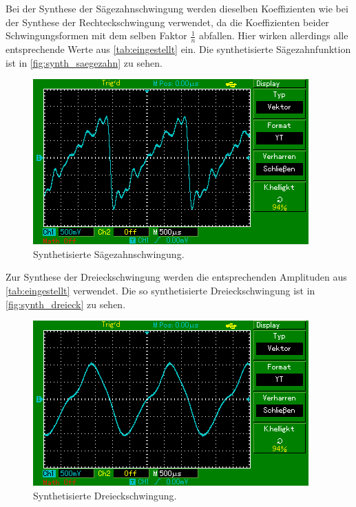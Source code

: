 Bei der Synthese der Sägezahnschwingung werden dieselben Koeffizienten wie bei der Synthese der Rechteckschwingung verwendet, da
die Koeffizienten beider Schwingungsformen mit dem selben Faktor $\frac{1}{n}$ abfallen. Hier wirken allerdings alle 
entsprechende Werte aus \autoref{tab:eingestellt} ein. Die synthetisierte Sägezahnfunktion 
ist in \autoref{fig:synth_saegezahn} zu sehen.
\begin{figure}
  \centering
  \includegraphics{content/MAP001.png}
  \caption{Synthetisierte Sägezahnschwingung.}
  \label{fig:synth_saegezahn}
\end{figure}

Zur Synthese der Dreieckschwingung werden die entsprechenden Amplituden aus \autoref{tab:eingestellt} verwendet.
Die so synthetisierte Dreieckschwingung ist in \autoref{fig:synth_dreieck} zu sehen.
\begin{figure}
  \centering
  \includegraphics{content/MAP003.png}
  \caption{Synthetisierte Dreieckschwingung.}
  \label{fig:synth_dreieck}
\end{figure}